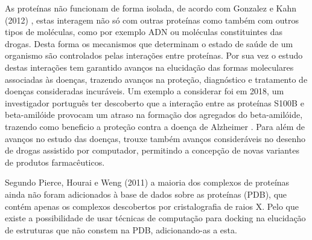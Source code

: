 As proteínas não funcionam de forma isolada, de acordo com Gonzalez e Kahn (2012) \cite{gonzalez2012protein}, estas interagem não só com outras proteínas como também com outros tipos de moléculas, como por exemplo ADN ou moléculas constituintes das drogas. Desta forma os mecanismos que determinam o estado de saúde de um organismo são controlados pelas interações entre proteínas. 
Por sua vez o estudo destas interações tem garantido avanços na elucidação das formas moleculares associadas às doenças, trazendo avanços na proteção, diagnóstico e tratamento de doenças consideradas incuráveis. Um exemplo a considerar foi em 2018, um investigador português ter descoberto que a interação entre as proteínas S100B e beta-amilóide provocam um atraso na formação dos agregados do beta-amilóide, trazendo como beneficio a proteção contra a doença de Alzheimer \cite{noticia}. Para além de avanços no estudo das doenças, trouxe também avanços consideráveis no desenho de drogas assistido por computador, permitindo a concepção de novas variantes de produtos farmacêuticos.\par
Segundo Pierce, Hourai e Weng (2011) \cite{ZDOCKaccelerating} a maioria dos complexos de proteínas ainda não foram adicionados à base de dados sobre as proteínas (PDB), que contém apenas os complexos descobertos por cristalografia de raios X. Pelo que existe a possibilidade de usar técnicas de computação para docking na elucidação de estruturas que não constem na PDB, adicionando-as a esta.\par
